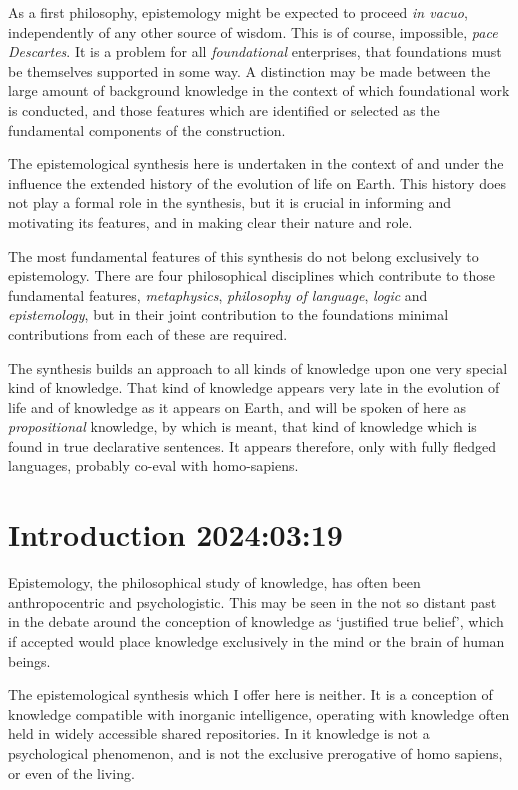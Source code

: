 \documentclass[10pt,titlepage]{book}
\begin{document}
As a first philosophy, epistemology might be expected to proceed \emph{in vacuo}, independently of any other source of wisdom.
This is of course, impossible, \emph{pace Descartes}.
It is a problem for all \emph{foundational} enterprises, that foundations must be themselves supported in some way.
A distinction may be made between the large amount of background knowledge in the context of which foundational work is conducted, and those features which are identified or selected as the fundamental components of the construction.

The epistemological synthesis here is undertaken in the context of and under the influence the extended history of the evolution of life on Earth.
This history does not play a formal role in the synthesis, but it is crucial in informing and motivating its features, and in making clear their nature and role.

The most fundamental features of this synthesis do not belong exclusively to epistemology.
There are four philosophical disciplines which contribute to those fundamental features, \emph{metaphysics}, \emph{philosophy of language}, \emph{logic} and \emph{epistemology}, but in their joint contribution to the foundations minimal contributions from each of these are required.

The synthesis builds an approach to all kinds of knowledge upon one very special kind of knowledge.
That kind of knowledge appears very late in the evolution of life and of knowledge as it appears on Earth, and will be spoken of here as \emph{propositional} knowledge, by which is meant, that kind of knowledge which is found in true declarative sentences.
It appears therefore, only with fully fledged languages, probably co-eval with homo-sapiens.

\chapter{Introduction 2024:03:19}

Epistemology, the philosophical study of knowledge, has often been anthropocentric and psychologistic.
This may be seen in the not so distant past in the debate around the conception of knowledge as `justified true belief', which if accepted would place knowledge exclusively in the mind or the brain of human beings.

The epistemological synthesis which I offer here is neither.
It is a conception of knowledge compatible with inorganic intelligence, operating with knowledge often held in widely accessible shared repositories.
In it knowledge is not a psychological phenomenon, and is not the exclusive prerogative of homo sapiens, or even of the living.
\end{document}

